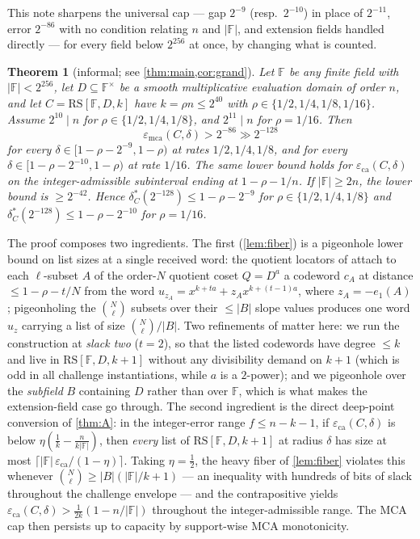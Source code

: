 \documentclass[11pt]{article}
\newtheorem{theorem}{Theorem}[section]
\theoremstyle{definition}
\theoremstyle{remark}
\newcommand{\F}{\mathbb{F}}
\newcommand{\B}{B}
\newcommand{\RS}{\mathrm{RS}}
\newcommand{\eca}{\varepsilon_{\mathrm{ca}}}
\newcommand{\emca}{\varepsilon_{\mathrm{mca}}}
\newcommand{\eone}{e_1}
\begin{document}
This note sharpens the universal cap --- gap $2^{-9}$ (resp.\ $2^{-10}$) in place of $2^{-11}$, error $2^{-86}$ with no condition relating $n$ and $|\F|$, and extension fields handled directly --- for every field below $2^{256}$ at once, by changing what is counted.


\begin{theorem}[informal; see \cref{thm:main,cor:grand}]\label{thm:informal}
Let $\F$ be any finite field with $|\F|<2^{256}$, let $D\subseteq\F^\times$ be a smooth multiplicative evaluation domain of order $n$, and let $C=\RS[\F,D,k]$ have $k=\rho n\le2^{40}$ with $\rho\in\{1/2,1/4,1/8,1/16\}$. Assume $2^{10}\mid n$ for $\rho\in\{1/2,1/4,1/8\}$, and $2^{11}\mid n$ for $\rho=1/16$. Then
\[
\emca(C,\delta)>2^{-86}\gg2^{-128}
\]
for every $\delta\in[1-\rho-2^{-9},1-\rho)$ at rates $1/2,1/4,1/8$, and for every $\delta\in[1-\rho-2^{-10},1-\rho)$ at rate $1/16$. The same lower bound holds for $\eca(C,\delta)$ on the integer-admissible subinterval ending at $1-\rho-1/n$. If $|\F|\ge2n$, the lower bound is $\ge2^{-42}$. Hence $\delta^*_C(2^{-128})\le1-\rho-2^{-9}$ for $\rho\in\{1/2,1/4,1/8\}$ and $\delta^*_C(2^{-128})\le1-\rho-2^{-10}$ for $\rho=1/16$.
\end{theorem}

The proof composes two ingredients. The first (\cref{lem:fiber}) is a pigeonhole lower bound on list sizes at a single received word: the quotient locators of \cite{Cho26a} attach to each $\ell$-subset $A$ of the order-$N$ quotient coset $Q=D^{a}$ a codeword $c_A$ at distance $\le1-\rho-t/N$ from the word $u_{z_A}=x^{k+ta}+z_Ax^{k+(t-1)a}$, where $z_A=-\eone(A)$; pigeonholing the $\binom N\ell$ subsets over their $\le|\B|$ slope values produces one word $u_z$ carrying a list of size $\binom N\ell/|\B|$. Two refinements of \cite[Main Thm.\,(d)]{Cho26a} matter here: we run the construction at \emph{slack two} ($t=2$), so that the listed codewords have degree $\le k$ and live in $\RS[\F,D,k+1]$ without any divisibility demand on $k+1$ (which is odd in all challenge instantiations, while $a$ is a $2$-power); and we pigeonhole over the \emph{subfield} $\B$ containing $D$ rather than over $\F$, which is what makes the extension-field case go through. The second ingredient is the direct deep-point conversion of \cref{thm:A}: in the integer-error range $f\le n-k-1$, if $\eca(C,\delta)$ is below $\eta(\frac1k-\frac n{k|\F|})$, then \emph{every} list of $\RS[\F,D,k+1]$ at radius $\delta$ has size at most $\lceil|\F|\,\eca/(1-\eta)\rceil$. Taking $\eta=\frac12$, the heavy fiber of \cref{lem:fiber} violates this whenever $\binom N\ell\ge|\B|(|\F|/k+1)$ --- an inequality with hundreds of bits of slack throughout the challenge envelope --- and the contrapositive yields $\eca(C,\delta)>\frac1{2k}(1-n/|\F|)$ throughout the integer-admissible range. The MCA cap then persists up to capacity by support-wise MCA monotonicity.
\end{document}
